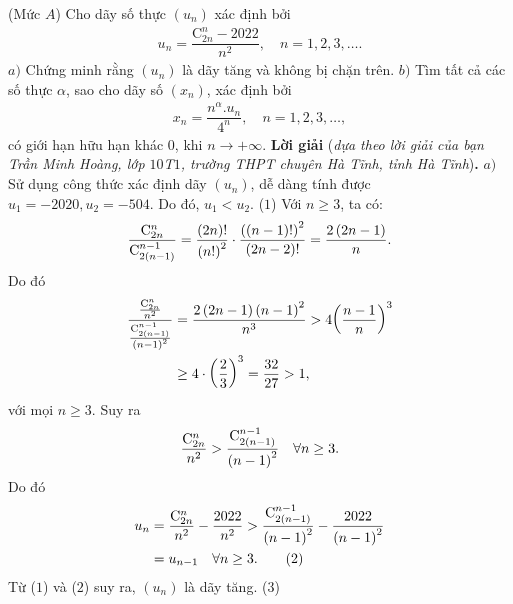 \begin{multicols}{2}
	(Mức $A$) Cho dãy số thực $(u_n)$ xác định bởi 
	\begin{align*}
		u_n=\dfrac{\text{C}^n_{2n}-2022}{n^2},\quad n=1,2,3,\ldots.
	\end{align*}
	$a)$ Chứng minh rằng $(u_n)$ là dãy tăng và không bị chặn trên.
	\vskip 0.05cm
	$b)$ Tìm tất cả các số thực $\alpha$,  sao cho dãy số $(x_n)$, xác định bởi
	\begin{align*}
		x_n=\dfrac{n^\alpha. u_n}{4^n},\quad n=1,2,3,\ldots,
	\end{align*}
	có giới hạn hữu hạn khác $0$, khi $n\to+\infty$.
	\vskip 0.05cm
	\textbf{\color{thachthuctoanhoc}Lời giải} (\textit{dựa theo lời giải của bạn Trần Minh Hoàng, lớp $10$T$1$, trường THPT chuyên Hà Tĩnh, tỉnh Hà Tĩnh})\textbf{\color{thachthuctoanhoc}.}
	\vskip 0.05cm
	$a)$ Sử dụng công thức xác định dãy  $(u_n)$, dễ dàng tính được $u_1 = -2020, u_2 = -504$.  Do đó, $u_1 < u_2$.  \hfill ($1$)
	\vskip 0.05cm
	Với $n \ge  3$, ta có:
	\begin{align*}
		\frac{{{\rm{C}}_{2n}^n}}{{{\rm{C}}_{2\left( {n - 1} \right)}^{n - 1}}} = \frac{{\left( {2n} \right)!}}{{{{\left( {n!} \right)}^2}}} \cdot \frac{{{{\left( {\left( {n - 1} \right)!} \right)}^2}}}{{\left( {2n - 2} \right)!}} = \frac{{2\left( {2n - 1} \right)}}{n}.
	\end{align*}
	Do đó
	\begin{align*}
		\frac{{\frac{{{\rm{C}}_{2n}^n}}{{{n^2}}}}}{{\frac{{{\rm{C}}_{2\left( {n - 1} \right)}^{n - 1}}}{{{{\left( {n - 1} \right)}^2}}}}} &= \frac{{2\left( {2n - 1} \right){{\left( {n - 1} \right)}^2}}}{{{n^3}}} > 4{\left( {\frac{{n - 1}}{n}} \right)^3} \\
		&\ge 4 \cdot {\left( {\frac{2}{3}} \right)^3} = \frac{{32}}{{27}} > 1,
	\end{align*}
	với mọi $n \ge  3$. Suy ra
	\begin{align*}
		\frac{{{\rm{C}}_{2n}^n}}{{{n^2}}} > \frac{{{\rm{C}}_{2\left( {n - 1} \right)}^{n - 1}}}{{{{\left( {n - 1} \right)}^2}}}\quad\forall n \ge 3.
	\end{align*}
	Do đó
	\begin{align*}
		{u_n} &= \frac{{{\rm{C}}_{2n}^n}}{{{n^2}}} - \frac{{2022}}{{{n^2}}} > \frac{{{\rm{C}}_{2\left( {n - 1} \right)}^{n - 1}}}{{{{\left( {n - 1} \right)}^2}}} - \frac{{2022}}{{{{\left( {n - 1} \right)}^2}}} \\
		&= {u_{n - 1}}\quad\forall n \ge 3. \tag{$2$}
	\end{align*}
	Từ ($1$) và ($2$) suy ra, $(u_n)$  là dãy tăng.                \hfill ($3$)

\end{multicols}
